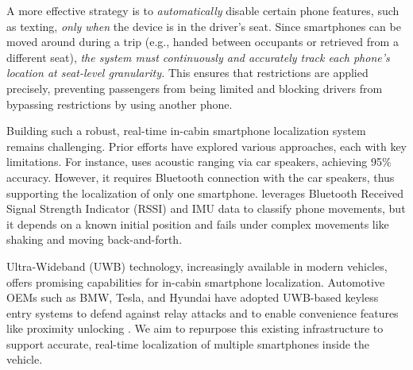 \documentclass[sigconf]{acmart}
\begin{document}
A more effective strategy is to \emph{automatically} disable 
certain phone features, such as texting, \emph{only when} the device is in the driver’s seat. 
Since smartphones can be moved around during a trip (e.g., handed between occupants or retrieved from a different seat), \emph{the system must continuously and accurately track each phone’s location at seat-level granularity.} 
%
This ensures that restrictions are applied precisely, preventing passengers from being limited and blocking drivers from bypassing restrictions by using another phone.

Building such a robust, real-time in-cabin smartphone localization system remains challenging.
%
Prior efforts have explored various approaches, each with key limitations. For instance, \cite{yang2011detecting} uses acoustic ranging via car 
speakers, achieving 95\% accuracy. However, it requires Bluetooth connection
with the car speakers, thus supporting the localization of only one smartphone. 
\cite{chen2022vehicle} leverages Bluetooth Received Signal Strength Indicator (RSSI) and IMU data to classify phone movements, but it depends on a known initial position and fails under complex movements like shaking and moving back-and-forth. 

Ultra‐Wideband (UWB) technology, increasingly available in modern vehicles, offers promising capabilities for in-cabin smartphone localization. 
%
Automotive OEMs such as BMW, 
Tesla, and Hyundai \cite{Bmw_2022,tesla_model3_manual_2025,hyundai_digital_key_2025} 
have adopted UWB-based keyless entry systems to defend against relay attacks \cite{fira_digital_key_2024,francillon2011relay} and to enable convenience features like proximity unlocking
\cite{ghabra2020apparatus,apple_uwb_car_keys_2021}.
%
We aim to repurpose this existing infrastructure to support accurate, real-time localization of multiple smartphones inside the vehicle.
\end{document}
